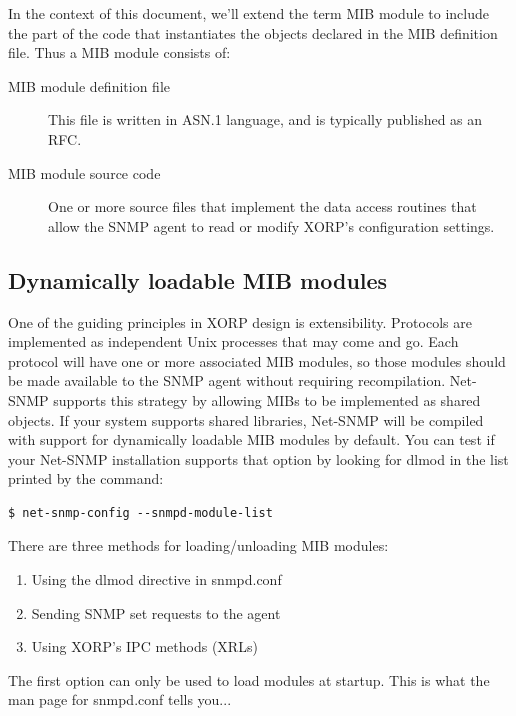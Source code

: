 \documentclass[11pt]{article}
\begin{document}
In the context of this document, we'll extend the term MIB module to include the
part of the code that instantiates the objects declared in the MIB definition
file.  Thus a MIB module consists of:

\begin{description}
    \item[MIB module definition file] This file is written in ASN.1 language, and is
typically published as an RFC.
    \item[MIB module source code] One or more source files that implement the data
access routines that allow the SNMP agent to read or modify XORP's configuration settings. 
\end{description} 






\subsection{Dynamically loadable MIB modules}
\label{sec:MIB_module_format}

One of the guiding principles in XORP design is extensibility.  Protocols are
implemented as independent Unix processes that may come and go.  Each protocol
will have one or more associated MIB modules, so those modules should be made
available to the SNMP agent without requiring recompilation.  Net-SNMP supports
this strategy by allowing MIBs to be implemented as shared objects.  If your
system supports shared libraries, Net-SNMP will be compiled with support for
dynamically loadable MIB modules by default.  You can test if your Net-SNMP installation supports that option by looking for dlmod in the list printed by the command:

\begin{verbatim}
$ net-snmp-config --snmpd-module-list
\end{verbatim}


There are three methods for loading/unloading MIB modules:  

\begin{enumerate}
\item Using the dlmod directive in snmpd.conf 
\item Sending SNMP set requests to the agent
\item Using XORP's IPC methods (XRLs)
\end{enumerate}

The first option can only be used to load modules at startup.  This is what the man page for snmpd.conf tells you...
\end{document}
